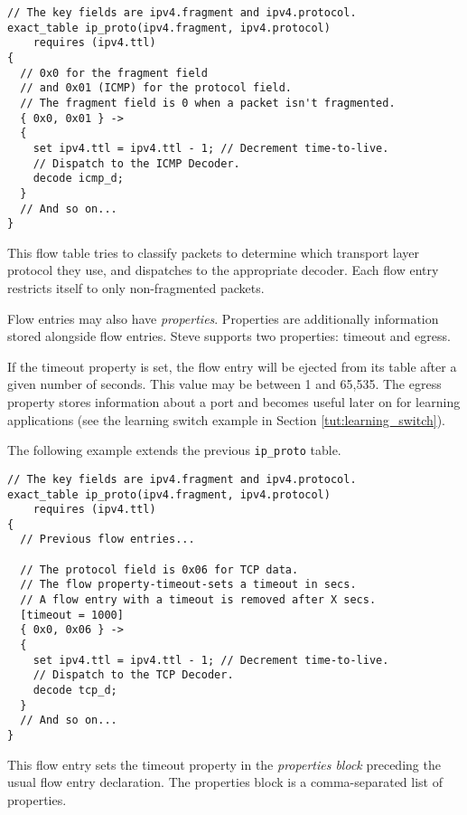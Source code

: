 \begin{codepage}
\begin{lstlisting}
// The key fields are ipv4.fragment and ipv4.protocol.
exact_table ip_proto(ipv4.fragment, ipv4.protocol)
	requires (ipv4.ttl)
{
  // 0x0 for the fragment field
  // and 0x01 (ICMP) for the protocol field.
  // The fragment field is 0 when a packet isn't fragmented.
  { 0x0, 0x01 } ->
  {
  	set ipv4.ttl = ipv4.ttl - 1; // Decrement time-to-live.
  	// Dispatch to the ICMP Decoder.
  	decode icmp_d;
  }
  // And so on...
}
\end{lstlisting}
\end{codepage}

This flow table tries to classify packets to determine which transport layer
protocol they use, and dispatches to the appropriate decoder.
Each flow entry restricts itself to only non-fragmented packets.

Flow entries may also have \textit{properties}. Properties are additionally
information stored alongside flow entries. Steve supports two properties:
timeout and egress.

If the timeout property is set, the flow entry will be ejected from its table
after a given number of seconds. This value may be between 1 and 65,535. The
egress property stores information about a port and becomes useful later on for learning
applications (see the learning switch example in Section
\ref{tut:learning_switch}).

The following example extends the previous \texttt{ip\_proto} table.

\begin{codepage}
\begin{lstlisting}
// The key fields are ipv4.fragment and ipv4.protocol.
exact_table ip_proto(ipv4.fragment, ipv4.protocol)
	requires (ipv4.ttl)
{
  // Previous flow entries...

  // The protocol field is 0x06 for TCP data.
  // The flow property-timeout-sets a timeout in secs.
  // A flow entry with a timeout is removed after X secs.
  [timeout = 1000]
  { 0x0, 0x06 } ->
  {
  	set ipv4.ttl = ipv4.ttl - 1; // Decrement time-to-live.
  	// Dispatch to the TCP Decoder.
  	decode tcp_d;
  }
  // And so on...
}
\end{lstlisting}
\end{codepage}

This flow entry sets the timeout property in the \textit{properties block}
preceding the usual flow entry declaration. The properties block is a
comma-separated list of properties.


